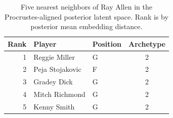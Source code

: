 \begin{table}[htbp]
  \centering\small
  \begin{tabular}{rllc}
    \toprule
    Rank & Player & Position & Archetype \\
    \midrule
    1 & Reggie Miller & G & 2 \\
    2 & Peja Stojakovic & F & 2 \\
    3 & Gradey Dick & G & 2 \\
    4 & Mitch Richmond & G & 2 \\
    5 & Kenny Smith & G & 2 \\
    \bottomrule
  \end{tabular}
  \caption{Five nearest neighbors of Ray Allen in the Procrustes-aligned posterior latent space. Rank is by posterior mean embedding distance.}
  \label{tab:Ray_Allen_neighbors}
\end{table}

